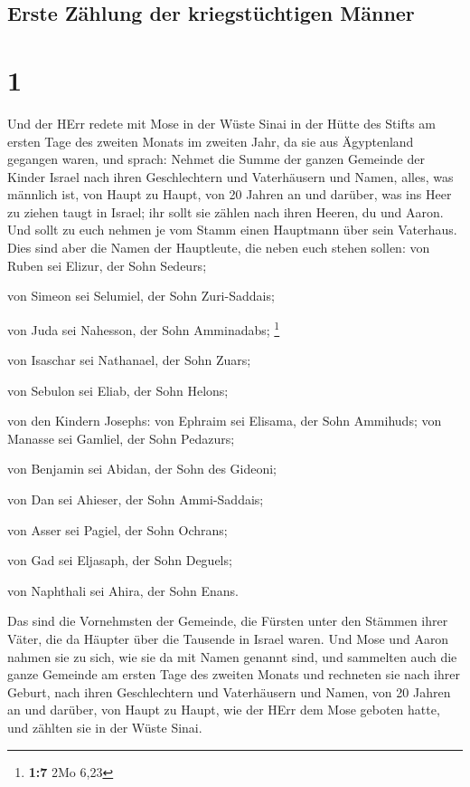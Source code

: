 \hypertarget{erste-zuxe4hlung-der-kriegstuxfcchtigen-muxe4nner}{%
\subsection{Erste Zählung der kriegstüchtigen
Männer}\label{erste-zuxe4hlung-der-kriegstuxfcchtigen-muxe4nner}}

\hypertarget{section}{%
\section{1}\label{section}}

 Und der HErr redete mit Mose in der Wüste Sinai in der
Hütte des Stifts am ersten Tage des zweiten Monats im zweiten Jahr, da
sie aus Ägyptenland gegangen waren, und sprach:  Nehmet
die Summe der ganzen Gemeinde der Kinder Israel nach ihren Geschlechtern
und Vaterhäusern und Namen, alles, was männlich ist, von Haupt zu Haupt,
 von 20 Jahren an und darüber, was ins Heer zu ziehen
taugt in Israel; ihr sollt sie zählen nach ihren Heeren, du und Aaron.
 Und sollt zu euch nehmen je vom Stamm einen Hauptmann
über sein Vaterhaus.  Dies sind aber die Namen der
Hauptleute, die neben euch stehen sollen: von Ruben sei Elizur, der Sohn
Sedeurs;

 von Simeon sei Selumiel, der Sohn Zuri-Saddais;

 von Juda sei Nahesson, der Sohn Amminadabs; \footnote{\textbf{1:7}
  2Mo 6,23}

 von Isaschar sei Nathanael, der Sohn Zuars;

 von Sebulon sei Eliab, der Sohn Helons;

 von den Kindern Josephs: von Ephraim sei Elisama, der
Sohn Ammihuds; von Manasse sei Gamliel, der Sohn Pedazurs;

 von Benjamin sei Abidan, der Sohn des Gideoni;

 von Dan sei Ahieser, der Sohn Ammi-Saddais;

 von Asser sei Pagiel, der Sohn Ochrans;

 von Gad sei Eljasaph, der Sohn Deguels;

 von Naphthali sei Ahira, der Sohn Enans.

 Das sind die Vornehmsten der Gemeinde, die Fürsten unter
den Stämmen ihrer Väter, die da Häupter über die Tausende in Israel
waren.  Und Mose und Aaron nahmen sie zu sich, wie sie da
mit Namen genannt sind,  und sammelten auch die ganze
Gemeinde am ersten Tage des zweiten Monats und rechneten sie nach ihrer
Geburt, nach ihren Geschlechtern und Vaterhäusern und Namen, von 20
Jahren an und darüber, von Haupt zu Haupt,  wie der HErr
dem Mose geboten hatte, und zählten sie in der Wüste Sinai.

